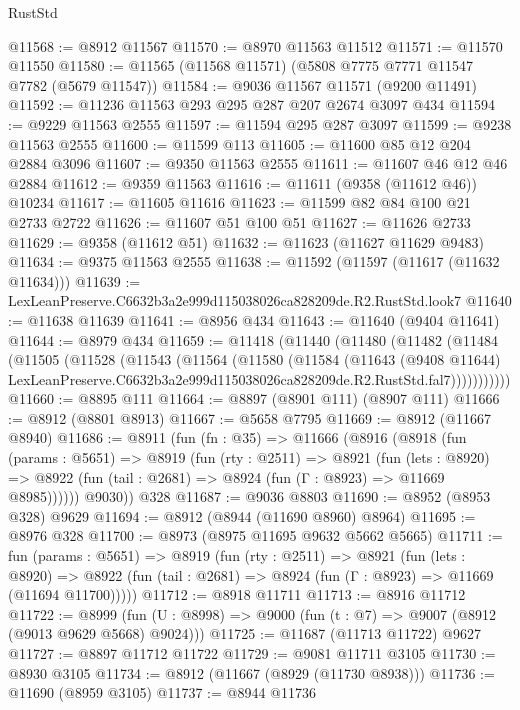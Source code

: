 \begin{lexlean}{RustStd}
\begin{coremodule}
@11568 := @8912 @11567
@11570 := @8970 @11563 @11512
@11571 := @11570 @11550
@11580 := @11565 (@11568 @11571) (@5808 @7775 @7771 @11547 @7782 (@5679 @11547))
@11584 := @9036 @11567 @11571 (@9200 @11491)
@11592 := @11236 @11563 @293 @295 @287 @207 @2674 @3097 @434
@11594 := @9229 @11563 @2555
@11597 := @11594 @295 @287 @3097
@11599 := @9238 @11563 @2555
@11600 := @11599 @113
@11605 := @11600 @85 @12 @204 @2884 @3096
@11607 := @9350 @11563 @2555
@11611 := @11607 @46 @12 @46 @2884
@11612 := @9359 @11563
@11616 := @11611 (@9358 (@11612 @46)) @10234
@11617 := @11605 @11616
@11623 := @11599 @82 @84 @100 @21 @2733 @2722
@11626 := @11607 @51 @100 @51
@11627 := @11626 @2733
@11629 := @9358 (@11612 @51)
@11632 := @11623 (@11627 @11629 @9483)
@11634 := @9375 @11563 @2555
@11638 := @11592 (@11597 (@11617 (@11632 @11634)))
@11639 := LexLeanPreserve.C6632b3a2e999d115038026ca828209de.R2.RustStd.look7
@11640 := @11638 @11639
@11641 := @8956 @434
@11643 := @11640 (@9404 @11641)
@11644 := @8979 @434
@11659 := @11418
    (@11440
      (@11480
        (@11482
          (@11484
            (@11505
              (@11528
                (@11543
                  (@11564
                    (@11580
                      (@11584
                        (@11643
                          (@9408 @11644)
                          LexLeanPreserve.C6632b3a2e999d115038026ca828209de.R2.RustStd.fal7)))))))))))
@11660 := @8895 @111
@11664 := @8897 (@8901 @111) (@8907 @111)
@11666 := @8912 (@8801 @8913)
@11667 := @5658 @7795
@11669 := @8912 (@11667 @8940)
@11686 := @8911
    (fun (fn : @35) =>
    @11666
      (@8916
        (@8918
          (fun (params : @5651) =>
          @8919
            (fun (rty : @2511) =>
            @8921
              (fun (lets : @8920) =>
              @8922 (fun (tail : @2681) => @8924 (fun (Γ : @8923) => @11669 @8985))))))
        @9030))
    @328
@11687 := @9036 @8803
@11690 := @8952 (@8953 @328) @9629
@11694 := @8912 (@8944 (@11690 @8960) @8964)
@11695 := @8976 @328
@11700 := @8973 (@8975 @11695 @9632 @5662 @5665)
@11711 := fun (params : @5651) =>
  @8919
    (fun (rty : @2511) =>
    @8921
      (fun (lets : @8920) =>
      @8922 (fun (tail : @2681) => @8924 (fun (Γ : @8923) => @11669 (@11694 @11700)))))
@11712 := @8918 @11711
@11713 := @8916 @11712
@11722 := @8999 (fun (U : @8998) => @9000 (fun (t : @7) => @9007 (@8912 (@9013 @9629 @5668) @9024)))
@11725 := @11687 (@11713 @11722) @9627
@11727 := @8897 @11712 @11722
@11729 := @9081 @11711 @3105
@11730 := @8930 @3105
@11734 := @8912 (@11667 (@8929 (@11730 @8938)))
@11736 := @11690 (@8959 @3105)
@11737 := @8944 @11736

\end{coremodule}
\end{lexlean}
